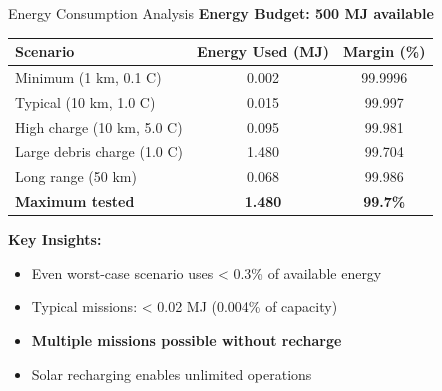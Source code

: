 \documentclass[aspectratio=169]{beamer}
\begin{document}
\begin{frame}{Energy Consumption Analysis}
\textbf{Energy Budget: 500 MJ available}

\vspace{0.5em}
\begin{table}
\footnotesize
\begin{tabular}{lcc}
\toprule
\textbf{Scenario} & \textbf{Energy Used (MJ)} & \textbf{Margin (\%)} \\
\midrule
Minimum (1 km, 0.1 C) & 0.002 & 99.9996 \\
Typical (10 km, 1.0 C) & 0.015 & 99.997 \\
High charge (10 km, 5.0 C) & 0.095 & 99.981 \\
Large debris charge (1.0 C) & 1.480 & 99.704 \\
Long range (50 km) & 0.068 & 99.986 \\
\midrule
\textbf{Maximum tested} & \textbf{1.480} & \textbf{99.7\%} \\
\bottomrule
\end{tabular}
\end{table}

\vspace{1em}
\textbf{Key Insights:}
\begin{itemize}
    \item Even worst-case scenario uses < 0.3\% of available energy
    \item Typical missions: < 0.02 MJ (0.004\% of capacity)
    \item \textbf{Multiple missions possible without recharge}
    \item Solar recharging enables unlimited operations
\end{itemize}
\end{frame}
\end{document}
